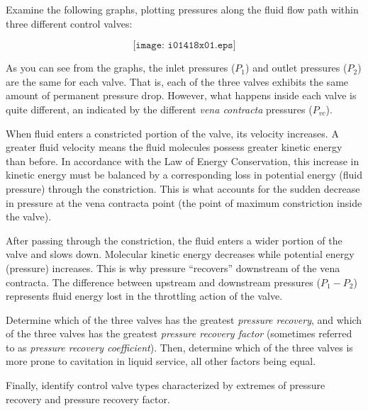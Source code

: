 

Examine the following graphs, plotting pressures along the fluid flow path within three different control valves:

$$\texttt{[image: i01418x01.eps]}$$

As you can see from the graphs, the inlet pressures ($P_1$) and outlet pressures ($P_2$) are the same for each valve.  That is, each of the three valves exhibits the same amount of permanent pressure drop.  However, what happens inside each valve is quite different, an indicated by the different {\it vena contracta} pressures ($P_{vc}$).

When fluid enters a constricted portion of the valve, its velocity increases.  A greater fluid velocity means the fluid molecules possess greater kinetic energy than before.  In accordance with the Law of Energy Conservation, this increase in kinetic energy must be balanced by a corresponding loss in potential energy (fluid pressure) through the constriction.  This is what accounts for the sudden decrease in pressure at the vena contracta point (the point of maximum constriction inside the valve).  

After passing through the constriction, the fluid enters a wider portion of the valve and slows down.  Molecular kinetic energy decreases while potential energy (pressure) increases.  This is why pressure ``recovers'' downstream of the vena contracta.  The difference between upstream and downstream pressures ($P_1 - P_2$) represents fluid energy lost in the throttling action of the valve.

\vskip 10pt

Determine which of the three valves has the greatest {\it pressure recovery}, and which of the three valves has the greatest {\it pressure recovery factor} (sometimes referred to as {\it pressure recovery coefficient}).  Then, determine which of the three valves is more prone to cavitation in liquid service, all other factors being equal.

Finally, identify control valve types characterized by extremes of pressure recovery and pressure recovery factor.






